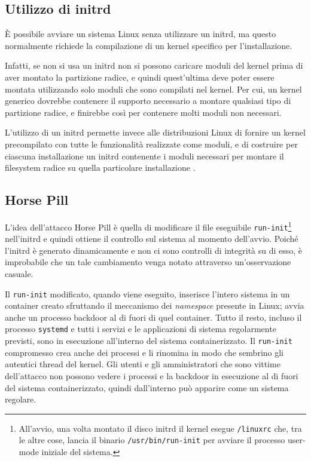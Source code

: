 \documentclass{article}
\begin{document}
\subsection{Utilizzo di initrd}
È possibile avviare un sistema Linux senza utilizzare un initrd, ma questo normalmente richiede la compilazione di un kernel specifico per l'installazione.

Infatti, se non si usa un initrd non si possono caricare moduli del kernel prima di aver montato la partizione radice, e quindi quest'ultima deve poter essere montata utilizzando solo moduli che sono compilati nel kernel. Per cui, un kernel generico dovrebbe contenere il supporto necessario a montare qualsiasi tipo di partizione radice, e finirebbe così per contenere molti moduli non necessari.

L'utilizzo di un initrd permette invece alle distribuzioni Linux di fornire un kernel precompilato con tutte le funzionalità realizzate come moduli, e di costruire per ciascuna installazione un initrd contenente i moduli necessari per montare il filesystem radice su quella particolare installazione \cite{initrd}.

\subsection{Horse Pill}
L'idea dell'attacco Horse Pill è quella di modificare il file eseguibile \texttt{run-init}\footnote{All'avvio, una volta montato il disco initrd il kernel esegue \texttt{/linuxrc} che, tra le altre cose, lancia il binario \texttt{/usr/bin/run-init} per avviare il processo user-mode iniziale del sistema.} nell'initrd e quindi ottiene il controllo sul sistema al momento dell'avvio. Poiché l'initrd è generato dinamicamente e non ci sono controlli di integrità su di esso, è improbabile che un tale cambiamento venga notato attraverso un'osservazione casuale.

Il \texttt{run-init} modificato, quando viene eseguito, inserisce l'intero sistema in un container creato sfruttando il meccanismo dei \textsl{namespace} presente in Linux; avvia anche un processo backdoor al di fuori di quel container. Tutto il resto, incluso il processo \texttt{systemd} e tutti i servizi e le applicazioni di sistema regolarmente previsti, sono in esecuzione all'interno del sistema containerizzato. Il \texttt{run-init} compromesso crea anche dei processi e li rinomina in modo che sembrino gli autentici thread del kernel. Gli utenti e gli amministratori che sono vittime dell'attacco non possono vedere i processi e la backdoor in esecuzione al di fuori del sistema containerizzato, quindi dall'interno può apparire come un sistema regolare.
\end{document}
